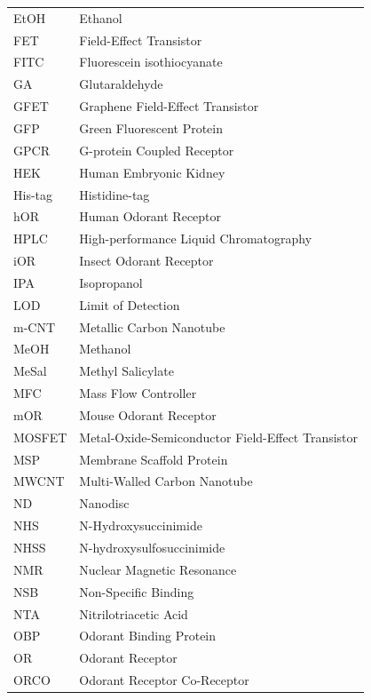 \documentclass[
  a4paper,
]{scrbook}
\begin{document}
\newpage
\fancyhf{} %
\thispagestyle{fancy} %
\renewcommand{\headrulewidth}{0pt}
\fancyfoot[L]{\thepage} %
\begin{table}[H]
  \begin{tabular}{@{}p{} p{}@{}}  %
    EtOH  & Ethanol  \\[5pt]
    FET  & Field-Effect Transistor  \\[5pt]
    FITC  & Fluorescein isothiocyanate  \\[5pt]
    GA  & Glutaraldehyde  \\[5pt]
    GFET  & Graphene Field-Effect Transistor  \\[5pt]
    GFP  & Green Fluorescent Protein  \\[5pt]
    GPCR  & G-protein Coupled Receptor  \\[5pt]
    HEK  & Human Embryonic Kidney  \\[5pt]
    His-tag  & Histidine-tag  \\[5pt]
    hOR  & Human Odorant Receptor  \\[5pt]
    HPLC  & High-performance Liquid Chromatography   \\[5pt]
    iOR  & Insect Odorant Receptor  \\[5pt]
    IPA  & Isopropanol  \\[5pt]
    LOD  & Limit of Detection  \\[5pt]
    m-CNT  & Metallic Carbon Nanotube   \\[5pt]
    MeOH  & Methanol   \\[5pt]
    MeSal  & Methyl Salicylate   \\[5pt]
    MFC  & Mass Flow Controller   \\[5pt]
    mOR  & Mouse Odorant Receptor  \\[5pt]
    MOSFET  & Metal-Oxide-Semiconductor Field-Effect Transistor  \\[5pt]
    MSP  & Membrane Scaffold Protein  \\[5pt]
    MWCNT  & Multi-Walled Carbon Nanotube  \\[5pt]
    ND  & Nanodisc  \\[5pt]
    NHS  & N-Hydroxysuccinimide  \\[5pt]
    NHSS  & N-hydroxysulfosuccinimide   \\[5pt]
    NMR  & Nuclear Magnetic Resonance  \\[5pt]
    NSB  & Non-Specific Binding   \\[5pt]
    NTA  & Nitrilotriacetic Acid   \\[5pt]
    OBP  & Odorant Binding Protein  \\[5pt]
    OR  & Odorant Receptor  \\[5pt]
    ORCO  & Odorant Receptor Co-Receptor  \\[5pt]
  \end{tabular}
\end{table}
\end{document}
